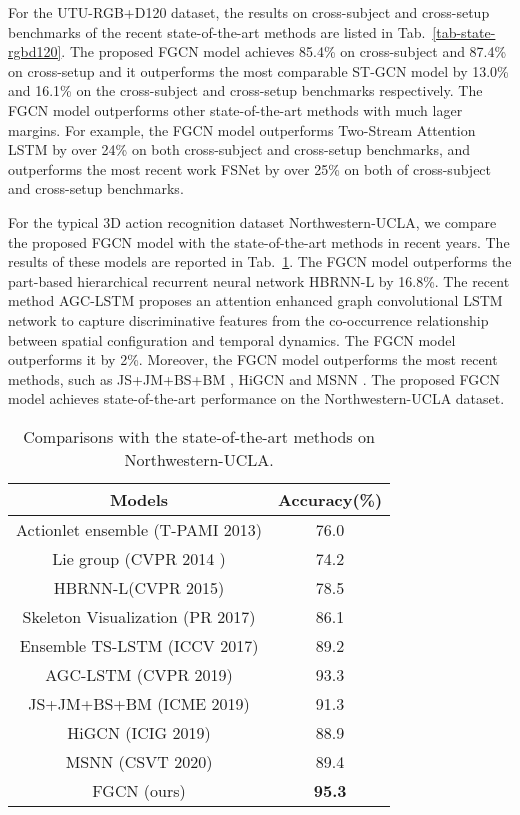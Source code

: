 \documentclass[runningheads]{llncs}
\begin{document}
For the UTU-RGB+D120 dataset, the results on cross-subject and cross-setup benchmarks of the recent state-of-the-art methods are listed in Tab.~\ref{tab-state-rgbd120}. The proposed FGCN model achieves 85.4\% on cross-subject and 87.4\% on cross-setup and it outperforms the most comparable ST-GCN model \cite{yan2018spatial} by 13.0\% and 16.1\% on the cross-subject and cross-setup benchmarks respectively. The FGCN model outperforms other state-of-the-art methods with much lager margins. For example, the FGCN model outperforms Two-Stream Attention LSTM \cite{liu2017skeleton-tip} by over 24\% on both cross-subject and cross-setup benchmarks, and outperforms the most recent work FSNet \cite{liu2019skeleton} by over 25\% on both of cross-subject and cross-setup benchmarks.

For the typical 3D action recognition dataset Northwestern-UCLA, we compare the proposed FGCN model with the state-of-the-art methods in recent years. The results of these models are reported in Tab.~\ref{tab-state-ucla}. The FGCN model outperforms the part-based hierarchical recurrent neural network HBRNN-L \cite{du2015hierarchical} by 16.8\%. The recent method AGC-LSTM proposes an attention enhanced graph convolutional LSTM network to capture discriminative features from the co-occurrence relationship between spatial configuration and temporal dynamics. The FGCN model outperforms it by 2\%. Moreover, the FGCN model outperforms the most recent methods, such as JS+JM+BS+BM \cite{li2019learning}, HiGCN \cite{huang2019hierarchical} and MSNN \cite{shao2020learning}. The proposed FGCN model achieves state-of-the-art performance on the Northwestern-UCLA dataset.



\begin{table}[t]
	\caption{Comparisons with the state-of-the-art methods on Northwestern-UCLA.}
	\label{tab-state-ucla}
	\tabcolsep=10pt
	\centering
	\begin{tabular}{cc}
		\hline
		Models & Accuracy(\%) \\
		\hline
		Actionlet ensemble (T-PAMI 2013) \cite{wang2013learning}	&76.0 \\	
		Lie group (CVPR 2014 ) \cite{vemulapalli2014human}	&74.2 \\
		HBRNN-L(CVPR 2015) \cite{du2015hierarchical}	&78.5 \\
		Skeleton Visualization (PR 2017) \cite{liu2017enhanced}	&86.1 \\
		Ensemble TS-LSTM (ICCV 2017) \cite{lee2017ensemble}	&89.2 \\
		AGC-LSTM (CVPR 2019) \cite{si2019attention}	&93.3 \\
		JS+JM+BS+BM (ICME 2019) \cite{li2019learning} & 91.3 \\
		HiGCN (ICIG 2019) \cite{huang2019hierarchical} & 88.9 \\
		MSNN (CSVT 2020) \cite{shao2020learning} & 89.4 \\
		\hline
		FGCN (ours)	&\textbf{95.3} \\
		\hline
	\end{tabular}
\end{table}
\end{document}
